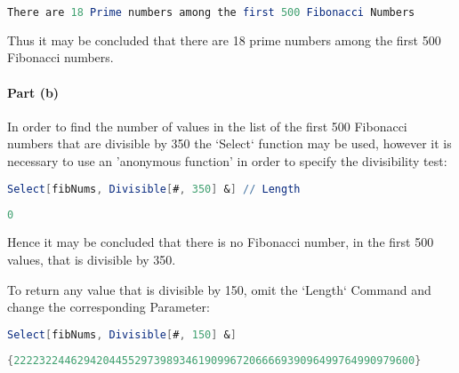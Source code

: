 \documentclass[12pt]{article}
\begin{document}
    \begin{lstlisting}[language = Mathematica]
    There are 18 Prime numbers among the first 500 Fibonacci Numbers
    \end{lstlisting}	

    Thus it may be concluded that there are 18 prime numbers among the first 500 Fibonacci numbers.


\paragraph{Part (b)}
In order to find the number of values in the list of the first 500 Fibonacci numbers that are divisible by 350 the `Select` function may be used, however it is necessary to use an 'anonymous function' in order to specify the divisibility test:

\begin{lstlisting}[language = Mathematica]
Select[fibNums, Divisible[#, 350] &] // Length
\end{lstlisting}	

\begin{lstlisting}[language = Mathematica]
0
\end{lstlisting}	

Hence it may be concluded that there is no Fibonacci number, in the first 500 values, that is divisible by 350.

To return any value that is  divisible by 150, omit the `Length` Command and change the corresponding Parameter:

\begin{lstlisting}[language = Mathematica]
Select[fibNums, Divisible[#, 150] &]
\end{lstlisting}	

\begin{lstlisting}[language = Mathematica]
{222232244629420445529739893461909967206666939096499764990979600}
\end{lstlisting}	
\end{document}

